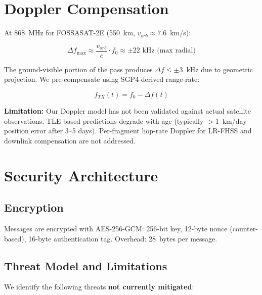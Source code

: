 \documentclass[11pt,a4paper]{article}
\begin{document}
\section{Doppler Compensation}
\label{sec:doppler}

At 868~MHz for FOSSASAT-2E (550~km, $v_{orb} \approx 7.6$~km/s):

\begin{equation}
\Delta f_{\max} \approx \frac{v_{orb}}{c} \cdot f_0 \approx \pm 22\text{ kHz (max radial)}
\end{equation}

The ground-visible portion of the pass produces $\Delta f \leq \pm 3$~kHz due to geometric projection. We pre-compensate using SGP4-derived range-rate:

\begin{equation}
f_{TX}(t) = f_0 - \Delta f(t)
\end{equation}

\textbf{Limitation:} Our Doppler model has not been validated against actual satellite observations. TLE-based predictions degrade with age (typically $>$1~km/day position error after 3--5 days). Per-fragment hop-rate Doppler for LR-FHSS and downlink compensation are not addressed.

\section{Security Architecture}
\label{sec:security}

\subsection{Encryption}

Messages are encrypted with AES-256-GCM: 256-bit key, 12-byte nonce (counter-based), 16-byte authentication tag. Overhead: 28~bytes per message.

\subsection{Threat Model and Limitations}

We identify the following threats \textbf{not currently mitigated}:
\end{document}
